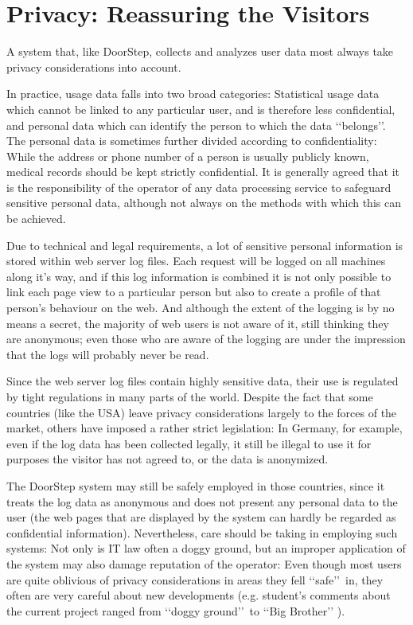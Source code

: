 \documentclass[a4paper]{danarticle}
\theoremstyle{remark}
\begin{document}
{  \section{Privacy: Reassuring the Visitors}
    A system that, like DoorStep, collects and analyzes user data most always 
    take privacy considerations into account. 
    
    In practice, usage data falls into two broad categories: Statistical usage 
    data which cannot be linked to any particular user, and is therefore less 
    confidential, and personal data which can identify the 
    person to which the data \lq\lq belongs\rq\rq . The personal data is 
    sometimes further divided according to confidentiality: While the address or 
    phone number of a person is usually publicly known, medical records should 
    be kept strictly confidential. It is generally agreed that it is the 
    responsibility of the operator of any data processing service to safeguard 
    sensitive personal data, although not always on the methods with which this 
    can be achieved. 
    
    Due to technical and legal requirements, a lot of sensitive personal 
    information is stored within web server log files. Each request will be 
    logged on all machines along it's way, and if this log information is 
    combined it is not only possible to link each page view to a particular 
    person but also to create a profile of that person's behaviour on the web. 
    And although the extent of the logging is by no means a secret, the majority 
    of web users is not aware of it, still thinking they are anonymous; even 
    those who are aware of the logging are under the impression that the logs 
    will probably never be read.
    
    Since the web server log files contain highly sensitive data, their use is 
    regulated by tight regulations in many parts of the world. Despite the fact 
    that some countries (like the USA) leave privacy considerations largely to 
    the forces of the market, others have imposed a rather strict legislation: 
    In Germany, for example, even if the log data has been collected legally, it 
    still be illegal to use it for purposes the visitor has not agreed to, or 
    the data is anonymized.
    
    The DoorStep system may still be safely employed in those countries, since 
    it treats the log data as anonymous and does not present any personal data 
    to the user (the web pages that are displayed by the system can hardly be 
    regarded as confidential information). Nevertheless, care should be taking 
    in employing such systems: Not only is IT law often a doggy ground, but an 
    improper application of the system may also damage reputation of the 
    operator: Even though most users are quite oblivious of privacy 
    considerations in areas they fell \lq\lq safe\rq\rq\ in, they often are very 
    careful about new developments (e.g. student's comments about the current 
    project ranged from \lq\lq doggy ground\rq\rq\ to \lq\lq Big Brother\rq\rq 
    ).
    
}
\end{document}

